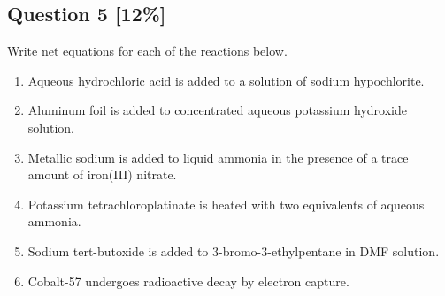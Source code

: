\documentclass{article}
\begin{document}
\subsection*{Question 5 [12\%]}
Write net equations for each of the reactions below.
\begin{enumerate}[label=\alph*.]
    \item Aqueous hydrochloric acid is added to a solution of sodium hypochlorite.
    \vspace{2cm}
    \item Aluminum foil is added to concentrated aqueous potassium hydroxide solution.
    \vspace{2cm}
    \item Metallic sodium is added to liquid ammonia in the presence of a trace amount of iron(III) nitrate.
    \vspace{2cm}
    \item Potassium tetrachloroplatinate is heated with two equivalents of aqueous ammonia.
    \vspace{2cm}
    \item Sodium tert-butoxide is added to 3-bromo-3-ethylpentane in DMF solution.
    \vspace{2cm}
    \item Cobalt-57 undergoes radioactive decay by electron capture.
    \vspace{2cm}
\end{enumerate}

\newpage
\end{document}
